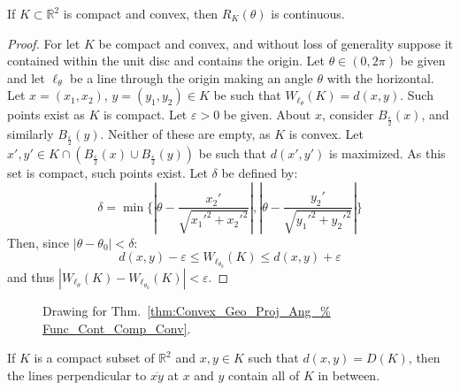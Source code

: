         \begin{theorem}
            \label{thm:Convex_Geo_Proj_Ang_Func_Cont_Comp_Conv}
            If $K\subset\mathbb{R}^2$ is compact and convex,
            then $R_K(\theta)$ is continuous.
        \end{theorem}
        \begin{proof}
            For let $K$ be compact and convex, and without loss
            of generality suppose it contained within the unit disc
            and contains the origin. Let $\theta\in (0,2\pi)$ be
            given and let $\ell_{\theta}$ be a line through the
            origin making an angle $\theta$ with the horizontal.
            Let $x=(x_1,x_2)$, $y=(y_1,y_2)\in{K}$ be such that
            $W_{\ell_{\theta}}(K)=d(x,y)$. Such points exist as
            $K$ is compact. Let $\varepsilon>0$ be given. About $x$,
            consider $B_{\frac{\varepsilon}{2}}(x)$, and similarly
            $B_{\frac{\varepsilon}{2}}(y)$. Neither of these are
            empty, as $K$ is convex. Let $x',y'\in K\cap(B_{\frac{\varepsilon}{2}}(x)\cup B_{\frac{\varepsilon}{2}}(y))$ be such that $d(x',y')$
            is maximized. As this set is compact, such points exist.
            Let $\delta$ be defined by:
            \begin{equation}
                \delta=
                \min\{|\theta-\frac{x_2'}{\sqrt{x_1'^2+x_2'^2}}|,
                    |\theta-\frac{y_2'}{\sqrt{y_1'^2+y_2'^2}}|\}
            \end{equation}
            Then, since $|\theta-\theta_0|<\delta$:
            \begin{equation}
                d(x,y)-\varepsilon\leq
                W_{\ell_{\theta_0}}(K)\leq
                d(x,y)+\varepsilon
            \end{equation}
            and thus $|W_{\ell_\theta}(K)-W_{\ell_{\theta_0}}(K)|< \varepsilon$.
        \end{proof}
        \begin{figure}
            \centering
            \captionsetup{type=figure}
            
            \caption{Drawing for Thm.~\ref{thm:Convex_Geo_Proj_Ang_%
                Func_Cont_Comp_Conv}.}
            \label{fig:Convex_Geo_Proj_Ang_Func_Cont_Comp_Conv}
        \end{figure}
        \begin{theorem}
            \label{thm:Convex_Geo_Two_Lines_Which_Contain_All_Comp_Conv}
            If $K$ is a compact subset of $\mathbb{R}^2$ and
            $x,y\in{K}$ such that $d(x,y)=D(K)$, then the
            lines perpendicular to $\overline{xy}$ at $x$ and
            $y$ contain all of $K$ in between.
        \end{theorem}
